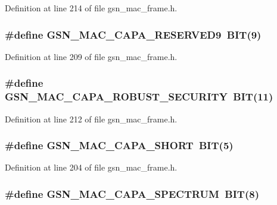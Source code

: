 Definition at line 214 of file gsn\_\-mac\_\-frame.h.

\hypertarget{a00523_a54043a0652e294648f141353f64b930f}{
\subsubsection[{GSN\_\-MAC\_\-CAPA\_\-RESERVED9}]{\setlength{\rightskip}{0pt plus 5cm}\#define GSN\_\-MAC\_\-CAPA\_\-RESERVED9~BIT(9)}}
\label{a00523_a54043a0652e294648f141353f64b930f}


Definition at line 209 of file gsn\_\-mac\_\-frame.h.

\hypertarget{a00523_a6c0a845a75e015b33135c1901ec347da}{
\subsubsection[{GSN\_\-MAC\_\-CAPA\_\-ROBUST\_\-SECURITY}]{\setlength{\rightskip}{0pt plus 5cm}\#define GSN\_\-MAC\_\-CAPA\_\-ROBUST\_\-SECURITY~BIT(11)}}
\label{a00523_a6c0a845a75e015b33135c1901ec347da}


Definition at line 212 of file gsn\_\-mac\_\-frame.h.

\hypertarget{a00523_a45a7deacef1941420c818f1778ac5254}{
\subsubsection[{GSN\_\-MAC\_\-CAPA\_\-SHORT}]{\setlength{\rightskip}{0pt plus 5cm}\#define GSN\_\-MAC\_\-CAPA\_\-SHORT~BIT(5)}}
\label{a00523_a45a7deacef1941420c818f1778ac5254}


Definition at line 204 of file gsn\_\-mac\_\-frame.h.

\hypertarget{a00523_a12e72b680f4bf7e12e43888e905a5c78}{
\subsubsection[{GSN\_\-MAC\_\-CAPA\_\-SPECTRUM}]{\setlength{\rightskip}{0pt plus 5cm}\#define GSN\_\-MAC\_\-CAPA\_\-SPECTRUM~BIT(8)}}
\label{a00523_a12e72b680f4bf7e12e43888e905a5c78}


